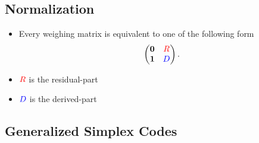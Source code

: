 \documentclass{beamer}
\newcommand{\rred}[1]{\textcolor{red}{#1}}
\newcommand{\bblue}[1]{\textcolor{blue}{#1}}
\begin{document}

\subsection{Normalization}

\begin{frame}

  \begin{itemize}
  \item Every weighing matrix is equivalent to one of the following form
    \[
      \begin{pmatrix}
        \textbf{0} & \rred{R} \\
        \textbf{1} & \bblue{D}
      \end{pmatrix}.
    \]
  \item $\rred{R}$ is the residual-part
  \item $\bblue{D}$ is the derived-part
  \end{itemize}
  
\end{frame}


\subsection{Generalized Simplex Codes}
\end{document}
